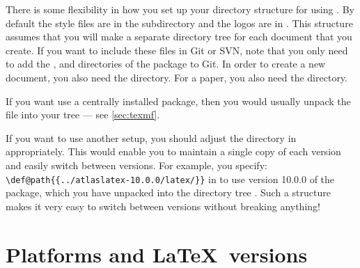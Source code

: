 There is some flexibility in how you set up your directory structure for using .
By default the  style files are in the  subdirectory and the
logos are in . This structure assumes that you will make a separate directory tree
for each document that you create.
If you want to include these files in Git or SVN, note that you only need to add the
,  and  directories of the  package to Git.
In order to create a new document, you also need the  directory.
For a paper, you also need the  directory.

If you want use a centrally installed  package, then you would usually unpack the\\
 file into your  tree --- see \cref{sec:texmf}.

If you want to use another setup, you should adjust the directory in  appropriately.
This would enable you to maintain a single copy of each  version and easily switch between versions.
For example, you specify:
\verb|\def@path{{../atlaslatex-10.0.0/latex/}}|
in 
to use version 10.0.0 of the  package, which you have unpacked into the directory tree
.
Such a structure makes it very easy to switch between  versions without breaking anything!



\section{Platforms and \LaTeX\ versions}
\label{sec:version}

